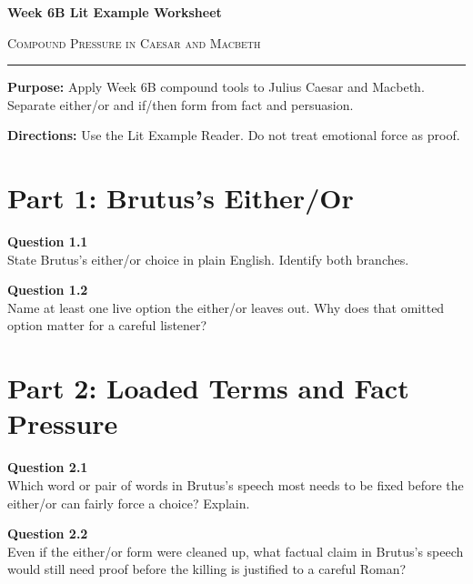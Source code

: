 \documentclass[12pt]{article}
\begin{document}
\begin{center}
{\LARGE\bfseries Week 6B Lit Example Worksheet}\par\vspace{0.05em}
{\large\scshape Compound Pressure in Caesar and Macbeth}\par\vspace{0.12em}
\rule{0.78\textwidth}{0.5pt}
\end{center}

\textbf{Purpose:} Apply Week 6B compound tools to Julius Caesar and Macbeth. Separate either/or and if/then form from fact and persuasion.

\textbf{Directions:} Use the Lit Example Reader. Do not treat emotional force as proof.

\section*{Part 1: Brutus's Either/Or}

\textbf{Question 1.1}\\[-0.15em]
State Brutus's either/or choice in plain English. Identify both branches.


\textbf{Question 1.2}\\[-0.15em]
Name at least one live option the either/or leaves out. Why does that omitted option matter for a careful listener?


\newpage

\section*{Part 2: Loaded Terms and Fact Pressure}

\textbf{Question 2.1}\\[-0.15em]
Which word or pair of words in Brutus's speech most needs to be fixed before the either/or can fairly force a choice? Explain.


\textbf{Question 2.2}\\[-0.15em]
Even if the either/or form were cleaned up, what factual claim in Brutus's speech would still need proof before the killing is justified to a careful Roman?


\newpage
\end{document}
